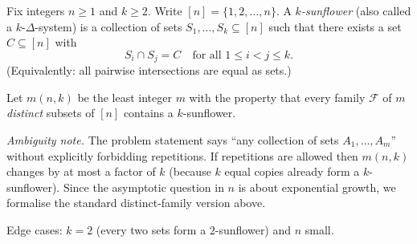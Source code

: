 Fix integers $n\ge 1$ and $k\ge 2$. Write $[n]=\{1,2,\dots,n\}$. A \emph{$k$-sunflower} (also called a $k$-$\Delta$-system) is a collection of sets $S_1,\dots,S_k\subseteq[n]$ such that there exists a set $C\subseteq[n]$ with
\[
S_i\cap S_j = C\quad\text{for all }1\le i<j\le k.
\]
(Equivalently: all pairwise intersections are equal as sets.)

Let $m(n,k)$ be the least integer $m$ with the property that every family $\mathcal F$ of $m$ \emph{distinct} subsets of $[n]$ contains a $k$-sunflower.

\emph{Ambiguity note.} The problem statement says ``any collection of sets $A_1,\dots,A_m$'' without explicitly forbidding repetitions. If repetitions are allowed then $m(n,k)$ changes by at most a factor of $k$ (because $k$ equal copies already form a $k$-sunflower). Since the asymptotic question in $n$ is about exponential growth, we formalise the standard distinct-family version above.

Edge cases: $k=2$ (every two sets form a $2$-sunflower) and $n$ small.
